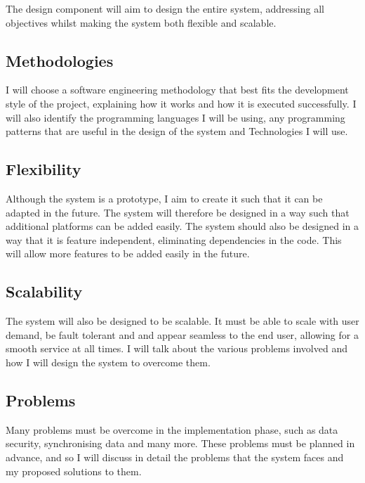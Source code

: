 The design component will aim to design the entire system, addressing all objectives whilst making the system both flexible and scalable.

\subsection{Methodologies}

I will choose a software engineering methodology that best fits the development style of the project, explaining how it works and how it is executed successfully. I will also identify the programming languages I will be using, any programming patterns that are useful in the design of the system and Technologies I will use.

\subsection{Flexibility}

Although the system is a prototype, I aim to create it such that it can be adapted in the future. The system will therefore be designed in a way such that additional platforms can be added easily. The system should also be designed in a way that it is feature independent, eliminating dependencies in the code. This will allow more features to be added easily in the future.

\subsection{Scalability}

The system will also be designed to be scalable. It must be able to scale with user demand, be fault tolerant and and appear seamless to the end user, allowing for a smooth service at all times. I will talk about the various problems involved and how I will design the system to overcome them.

\subsection{Problems}

Many problems must be overcome in the implementation phase, such as data security, synchronising data and many more. These problems must be planned in advance, and so I will discuss in detail the problems that the system faces and my proposed solutions to them.


